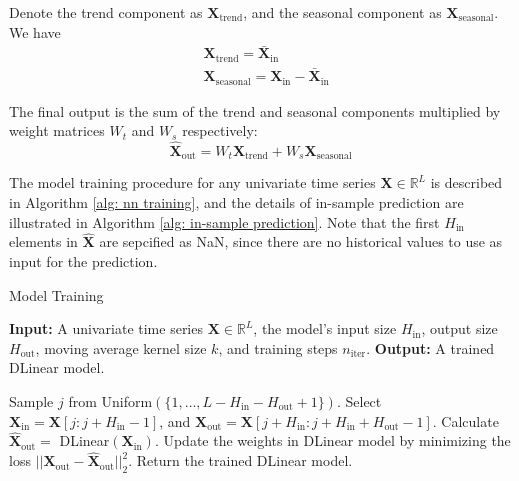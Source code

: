 \documentclass[11pt]{article}
\begin{document}
Denote the trend component as $\bm{X}_{\mathrm{trend}}$, and the seasonal component as $\bm{X}_{\mathrm{seasonal}}$. We have
\begin{align}
	&\bm{X}_{\mathrm{trend}} = \bar{\bm{X}}_{\mathrm{in}}\\
	&\bm{X}_{\mathrm{seasonal}} = \bm{X}_{\mathrm{in}} - \bar{\bm{X}}_{\mathrm{in}}
\end{align}

The final output is the sum of the trend and seasonal components multiplied by weight matrices $W_t$ and $W_s$ respectively:
\begin{equation}
	\hat{\bm{X}}_{\mathrm{out}} = W_t \bm{X}_{\mathrm{trend}} + W_s \bm{X}_{\mathrm{seasonal}}
\end{equation}



The model training procedure for any univariate time series $\bm{X} \in \mathbb{R}^L$ is described in Algorithm \ref{alg: nn training}, and the details of in-sample prediction are illustrated in Algorithm \ref{alg: in-sample prediction}. Note that the first $H_{\mathrm{in}}$ elements in $\hat{\bm{X}}$ are sepcified as NaN, since there are no historical values to use as input for the prediction.
 

\begin{algorithm}
\caption{Model Training}\label{alg: nn training}
\begin{algorithmic}[1] %
\State \textbf{Input:} A univariate time series $\bm{X} \in \mathbb{R}^L$, the model's input size $H_{\mathrm{in}}$, output size $H_{\mathrm{out}}$, moving average kernel size $k$, and training steps $n_{\mathrm{iter}}$.
\State \textbf{Output:} A trained DLinear model.

    \State Sample $j$ from Uniform$(\{1, \ldots, L-H_{\mathrm{in}}-H_{\mathrm{out}}+1\})$.
    \State Select $\bm{X}_{\mathrm{in}} = \bm{X}[j:j+H_{\mathrm{in}}-1]$, and $\bm{X}_{\mathrm{out}} = \bm{X}[j+H_{\mathrm{in}}:j+H_{\mathrm{in}}+H_{\mathrm{out}}-1]$.
    \State Calculate $\hat{\bm{X}}_{\mathrm{out}} =$ DLinear$(\bm{X}_{\mathrm{in}})$.
    \State Update the weights in DLinear model by minimizing the loss $||\bm{X}_{\mathrm{out}} - \hat{\bm{X}}_{\mathrm{out}}||^2_2$.
\EndFor
\State Return the trained DLinear model.
\end{algorithmic}
\end{algorithm}
\end{document}
